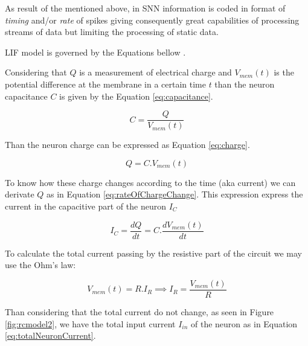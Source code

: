 			\par As result of the mentioned above, in SNN information is coded in format of \textit{timing} and/or \textit{rate} of spikes giving consequently great capabilities of processing streams of data but limiting the processing of static data.\newline
			
			\par LIF model is governed by the Equations bellow \cite{10242251}.\newline
			
			
			\par Considering that $Q$ is a measurement of electrical charge and $V_{mem}(t)$ is the potential difference at the membrane in a certain time $t$ than the neuron capacitance $C$ is given by the Equation \ref{eq:capacitance}.
			
			\begin{equation}
				\label{eq:capacitance}
				C = \frac{Q}{V_{mem}(t)}
			\end{equation}
			
			\par Than the neuron charge can be expressed as Equation \ref{eq:charge}.
			
			\begin{equation}
				\label{eq:charge}
				Q = C.V_{mem}(t)
			\end{equation}
		
			\par To know how these charge changes according to the time (aka current) we can derivate $Q$ as in Equation \ref{eq:rateOfChargeChange}. This expression express the current in the capacitive part of the neuron $I_C$
			
			\begin{equation}
				\label{eq:rateOfChargeChange}
				I_C = \dfrac{dQ}{dt} = C. \dfrac{dV_{mem}(t)}{dt}
			\end{equation}
		
		
			\par To calculate the total current passing by the resistive part of the circuit we may use the Ohm's law:
			
			\begin{equation}
				\label{eq:ohmlaw}
				V_{mem}(t) = R.I_R \implies I_R = \frac{V_{mem}(t)}{R}
			\end{equation}
			
			\par Than considering that the total current do not change, as seen in Figure \ref{fig:rcmodel2}, we have the total input current $I_{in}$ of the neuron as in Equation \ref{eq:totalNeuronCurrent}.
			
